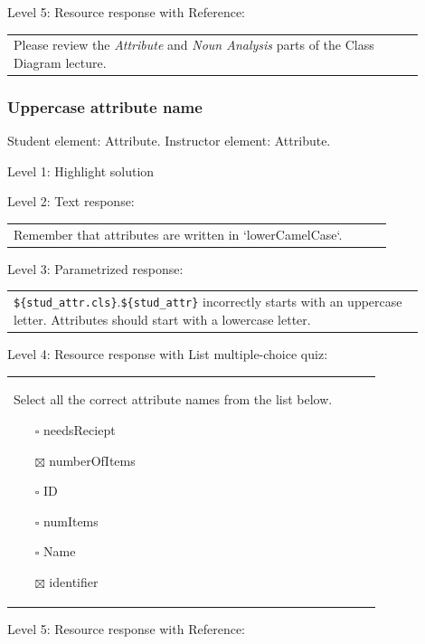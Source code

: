 \noindent Level 5: Resource response with Reference: \medskip

\begin{tabular}{|p{0.9\linewidth}}
Please review the \textit{Attribute} and \textit{Noun Analysis} parts of the Class Diagram lecture.
\end{tabular} \medskip


\subsubsection{Uppercase attribute name}

Student element: Attribute. Instructor element: Attribute. \medskip

\noindent Level 1: Highlight solution  \medskip

\noindent Level 2: Text response: \medskip

\begin{tabular}{|p{0.9\linewidth}}
Remember that attributes are written in `lowerCamelCase`.
\end{tabular} \medskip

\noindent Level 3: Parametrized response: \medskip

\begin{tabular}{|p{0.9\linewidth}}
\verb|${stud_attr.cls}|.\verb|${stud_attr}| incorrectly starts with an uppercase letter. Attributes should start with a lowercase letter.
\end{tabular} \medskip

\noindent Level 4: Resource response with List multiple-choice quiz: \medskip

\begin{tabular}{|p{0.9\linewidth}}

Select all the correct attribute names from the list below.

\begin{itemize}
    \item[$\square$] needsReciept
    \item[$\boxtimes$] numberOfItems
    \item[$\square$] ID
    \item[$\square$] numItems
    \item[$\square$] Name
    \item[$\boxtimes$] identifier
\end{itemize}

\end{tabular} \medskip

\noindent Level 5: Resource response with Reference: \medskip

